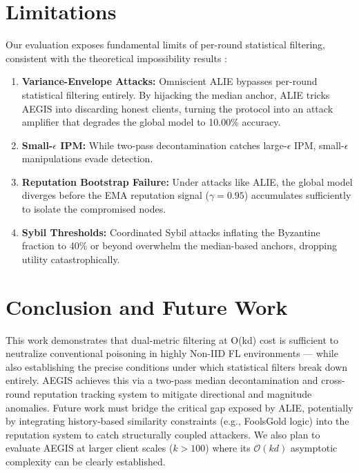 \documentclass[10pt, conference]{IEEEtran}
\begin{document}
\section{Limitations}
Our evaluation exposes fundamental limits of per-round statistical filtering, consistent with the theoretical impossibility results \cite{baruch2019}:
\begin{enumerate}
    \item \textbf{Variance-Envelope Attacks:} Omniscient ALIE bypasses per-round statistical filtering entirely. By hijacking the median anchor, ALIE tricks AEGIS into discarding honest clients, turning the protocol into an attack amplifier that degrades the global model to 10.00\% accuracy.
    \item \textbf{Small-$\epsilon$ IPM:} While two-pass decontamination catches large-$\epsilon$ IPM, small-$\epsilon$ manipulations evade detection.
    \item \textbf{Reputation Bootstrap Failure:} Under attacks like ALIE, the global model diverges before the EMA reputation signal ($\gamma=0.95$) accumulates sufficiently to isolate the compromised nodes.
    \item \textbf{Sybil Thresholds:} Coordinated Sybil attacks inflating the Byzantine fraction to 40\% or beyond overwhelm the median-based anchors, dropping utility catastrophically.
\end{enumerate}

\section{Conclusion and Future Work}
This work demonstrates that dual-metric filtering at O(kd) cost is sufficient to neutralize conventional poisoning in highly Non-IID FL environments — while also establishing the precise conditions under which statistical filters break down entirely. AEGIS achieves this via a two-pass median decontamination and cross-round reputation tracking system to mitigate directional and magnitude anomalies. Future work must bridge the critical gap exposed by ALIE, potentially by integrating history-based similarity constraints (e.g., FoolsGold logic) into the reputation system to catch structurally coupled attackers. We also plan to evaluate AEGIS at larger client scales ($k > 100$) where its $\mathcal{O}(kd)$ asymptotic complexity can be clearly established.
\end{document}

